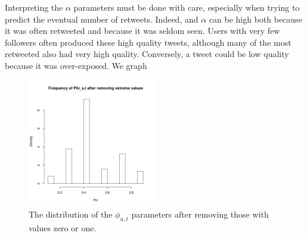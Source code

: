 Interpreting the $\alpha$ parameters must be done with care, especially when trying to predict the eventual number of retweets.
Indeed, and $\alpha$ can be high both because it was often retweeted and because it was seldom seen.
Users with very few followers often produced these high quality tweets, although many of the most retweeted also had very high quality.
Conversely, a tweet could be low quality because it was over-exposed.  We graph

\begin{figure}[h!]
  \centering
   \includegraphics[width=0.5\textwidth]{../src/Analysis/phihist.png}
   \caption{The distribution of the $\phi_{u,t}$ parameters after removing those with values zero or one. }
   \label{fig:phihist}
  
\end{figure}

